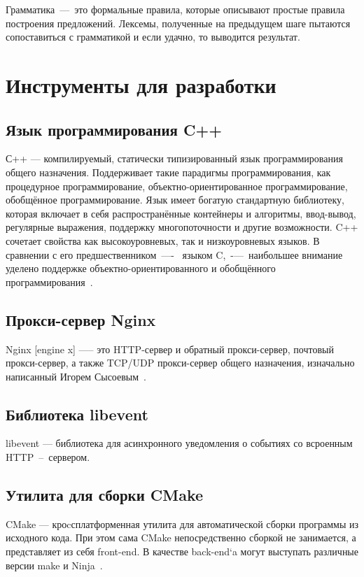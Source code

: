 Грамматика~---~это формальные правила, которые описывают простые правила
построения предложений. Лексемы, полученные на предыдущем шаге пытаются
сопоставиться с грамматикой и если удачно, то выводится результат.

\section{Инструменты для разработки}

\subsection{Язык программирования C++}
С++ --- компилируемый, статически типизированный язык программирования общего назначения.
Поддерживает такие парадигмы программирования, как процедурное программирование,
объектно-ориентированное программирование, обобщённое программирование.
Язык имеет богатую стандартную библиотеку, которая включает в себя
распространённые контейнеры и алгоритмы, ввод-вывод, регулярные выражения,
поддержку многопоточности и другие возможности. C++ сочетает свойства как
высокоуровневых, так и низкоуровневых языков. В сравнении с его предшественником~—-~
языком C,~-—~наибольшее внимание уделено поддержке объектно-ориентированного и
обобщённого программирования~\cite{cpp}.


\subsection{Прокси-сервер Nginx}
Nginx [engine x] —-- это HTTP-сервер и обратный прокси-сервер, почтовый
прокси-сервер, а также TCP/UDP прокси-сервер общего назначения, изначально
написанный Игорем Сысоевым~\cite{nginx}.

\subsection{Библиотека libevent}
libevent --- библиотека для асинхронного уведомления о событиях со всроенным
HTTP~--~сервером.

\subsection{Утилита для сборки CMake}

CMake — кроcсплатформенная утилита для автоматической сборки программы из
исходного кода. При этом сама CMake непосредственно сборкой не занимается,
а представляет из себя front-end. В качестве back-end`a могут выступать
различные версии make и Ninja~\cite{cmake}.

